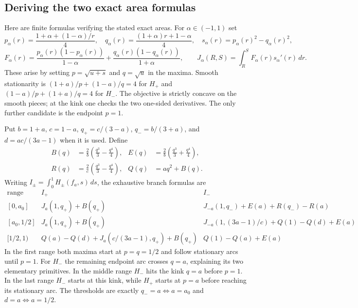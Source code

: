 \subsection{Deriving the two exact area formulas}
Here are finite formulas verifying the stated exact areas. For $\alpha\in(-1,1)$ set
\[
 p_\alpha(r)=\frac{1+\alpha+(1-\alpha)/r}{4},\quad
 q_\alpha(r)=\frac{(1+\alpha)r+1-\alpha}{4},\quad
 s_\alpha(r)=p_\alpha(r)^2-q_\alpha(r)^2,
\]
\[
 F_\alpha(r)=\frac{p_\alpha(r)(1-p_\alpha(r))}{1-\alpha}
 +\frac{q_\alpha(r)(1-q_\alpha(r))}{1+\alpha},\qquad
 J_\alpha(R,S)=\int_R^S F_\alpha(r)s_\alpha'(r)\,dr.
\]
These arise by setting $p=\sqrt{u+s}$ and $q=\sqrt u$ in the maxima. Smooth stationarity is $(1+a)/p+(1-a)/q=4$ for $H_+$ and $(1-a)/p+(1+a)/q=4$ for $H_-$. The objective is strictly concave on the smooth pieces; at the kink one checks the two one-sided derivatives. The only further candidate is the endpoint $p=1$.

Put $b=1+a$, $c=1-a$, $q_+=c/(3-a)$, $q_-=b/(3+a)$, and $d=ac/(3a-1)$ when it is used. Define
\[
 \begin{aligned}
 B(q)&=\frac2b\left(\frac{q^3}3-\frac{q^4}4\right),&
 E(q)&=\frac2b\left(\frac{q^3}3+\frac{q^4}4\right),\\
 R(q)&=\frac2c\left(\frac{q^3}3-\frac{q^4}4\right),&
 Q(q)&=a q^2+B(q).
 \end{aligned}
\]
Writing $I_\pm=\int_0^1H_\pm(f_a,s)\,ds$, the exhaustive branch formulas are
{\small
\[
\begin{array}{c|l|l}
\text{range}&I_+&I_-\\\hline
[0,a_0]&J_a(1,q_+)+B(q_+)&J_{-a}(1,q_-)+E(a)+R(q_-)-R(a)\\[2pt]
[a_0,1/2]&J_a(1,q_+)+B(q_+)&J_{-a}(1,(3a-1)/c)+Q(1)-Q(d)+E(a)\\[2pt]
[1/2,1)&Q(a)-Q(d)+J_a(c/(3a-1),q_+)+B(q_+)&Q(1)-Q(a)+E(a)
\end{array}
\]
}
In the first range both maxima start at $p=q=1/2$ and follow stationary arcs until $p=1$. For $H_-$ the remaining endpoint arc crosses $q=a$, explaining its two elementary primitives. In the middle range $H_-$ hits the kink $q=a$ before $p=1$. In the last range $H_-$ starts at this kink, while $H_+$ starts at $p=a$ before reaching its stationary arc. The thresholds are exactly $q_-=a\iff a=a_0$ and $d=a\iff a=1/2$.


